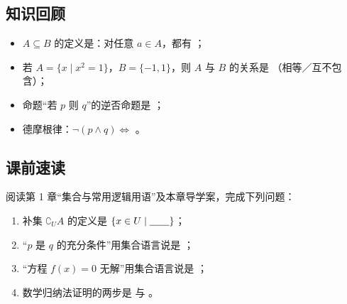 \begin{preview}
\subsection*{知识回顾}
\begin{itemize}
  \item $A\subseteq B$ 的定义是：对任意 $a\in A$，都有 \blank；
  \item 若 $A=\{x\mid x^2=1\}$，$B=\{-1,1\}$，则 $A$ 与 $B$ 的关系是 \blank（相等／互不包含）；
  \item 命题“若 $p$ 则 $q$”的逆否命题是 \blank；
  \item 德摩根律：$\neg(p\land q)\iff$ \blank。
\end{itemize}

\subsection*{课前速读}
阅读第 1 章“集合与常用逻辑用语”及本章导学案，完成下列问题：
\begin{enumerate}
  \item 补集 $\complement_U A$ 的定义是 $\{x\in U\mid \underline{\hspace{2em}}\}$；
  \item “$p$ 是 $q$ 的充分条件”用集合语言说是 \blank；
  \item “方程 $f(x)=0$ 无解”用集合语言说是 \blank；
  \item 数学归纳法证明的两步是 \blank 与 \blank。
\end{enumerate}
\end{preview}

